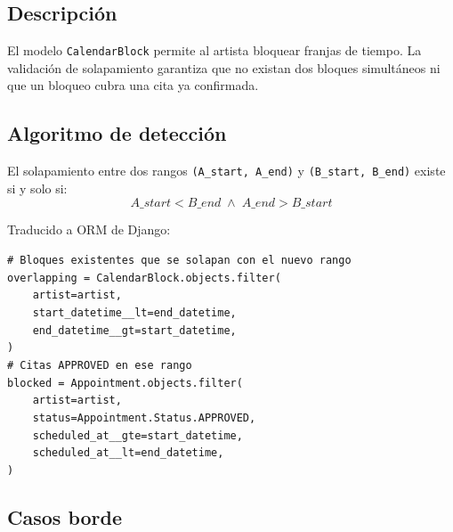 \documentclass[11pt,a4paper]{article}
\begin{document}
\subsection{Descripción}

El modelo \texttt{CalendarBlock} permite al artista bloquear franjas de tiempo.
La validación de solapamiento garantiza que no existan dos bloques simultáneos
ni que un bloqueo cubra una cita ya confirmada.

\subsection{Algoritmo de detección}

El solapamiento entre dos rangos \texttt{(A\_start, A\_end)} y \texttt{(B\_start, B\_end)}
existe si y solo si:
\[
A\_start < B\_end \;\wedge\; A\_end > B\_start
\]

Traducido a ORM de Django:

\begin{tcolorbox}[codebox, title={Query de detección de solapamiento (a agregar en CalendarBlockSerializer)}]
\texttt{\# Bloques existentes que se solapan con el nuevo rango}\\
\texttt{overlapping = CalendarBlock.objects.filter(}\\
\texttt{\ \ \ \ artist=artist,}\\
\texttt{\ \ \ \ start\_datetime\_\_lt=end\_datetime,}\\
\texttt{\ \ \ \ end\_datetime\_\_gt=start\_datetime,}\\
\texttt{)}\\[6pt]
\texttt{\# Citas APPROVED en ese rango}\\
\texttt{blocked = Appointment.objects.filter(}\\
\texttt{\ \ \ \ artist=artist,}\\
\texttt{\ \ \ \ status=Appointment.Status.APPROVED,}\\
\texttt{\ \ \ \ scheduled\_at\_\_gte=start\_datetime,}\\
\texttt{\ \ \ \ scheduled\_at\_\_lt=end\_datetime,}\\
\texttt{)}
\end{tcolorbox}

\subsection{Casos borde}
\end{document}
